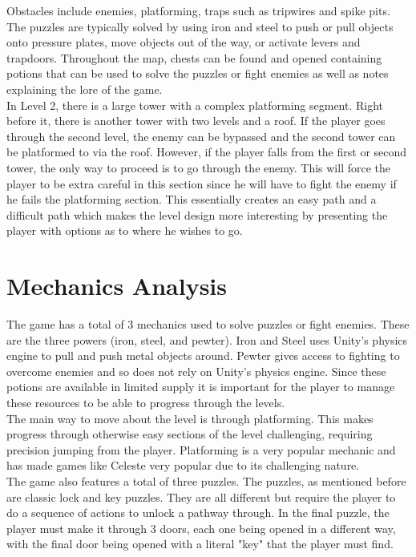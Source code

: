 \documentclass{article}
\begin{document}
Obstacles include enemies, platforming, traps such as tripwires and spike pits. The puzzles are typically solved by using iron and steel to push or pull objects onto pressure plates, move objects out of the way, or activate levers and trapdoors. Throughout the map, chests can be found and opened containing potions that can be used to solve the puzzles or fight enemies as well as notes explaining the lore of the game.\\

In Level 2, there is a large tower with a complex platforming segment. Right before it, there is another tower with two levels and a roof. If the player goes through the second level, the enemy can be bypassed and the second tower can be platformed to via the roof. However, if the player falls from the first or second tower, the only way to proceed is to go through the enemy. This will force the player to be extra careful in this section since he will have to fight the enemy if he fails the platforming section. This essentially creates an easy path and a difficult path which makes the level design more interesting by presenting the player with options as to where he wishes to go.

\section{Mechanics Analysis}
The game has a total of 3 mechanics used to solve puzzles or fight enemies. These are the three powers (iron, steel, and pewter). Iron and Steel uses Unity's physics engine to pull and push metal objects around. Pewter gives access to fighting to overcome enemies and so does not rely on Unity's physics engine. Since these potions are available in limited supply it is important for the player to manage these resources to be able to progress through the levels.\\

The main way to move about the level is through platforming. This makes progress through otherwise easy sections of the level challenging, requiring precision jumping from the player. Platforming is a very popular mechanic and has made games like Celeste very popular due to its challenging nature.\\

The game also features a total of three puzzles. The puzzles, as mentioned before are classic lock and key puzzles. They are all different but require the player to do a sequence of actions to unlock a pathway through. In the final puzzle, the player must make it through 3 doors, each one being opened in a different way, with the final door being opened with a literal "key" that the player must find.\\
\end{document}
